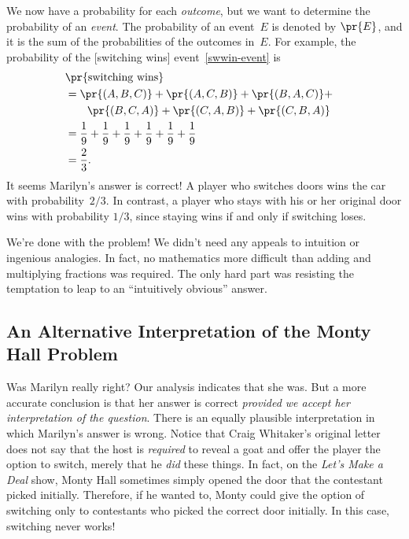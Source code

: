 We now have a probability for each \emph{outcome}, but we want to
determine the probability of an \emph{event}.  The probability of an
event~$E$ is denoted by $\pr{E}$, and it is the sum of the
probabilities of the outcomes in~$E$.  For example, the probability of
the [switching wins] event~\eqref{swwin-event} is
\begin{align*}
\lefteqn{\pr{\text{switching wins}}}\\
    & = \pr{(A, B, C)} + \pr{(A, C, B)} + \pr{(B, A, C)} + \\
    & \qquad \pr{(B, C, A)} + \pr{(C, A, B)} + \pr{(C, B, A)} \\
    & = \frac{1}{9} + \frac{1}{9} + \frac{1}{9} +
        \frac{1}{9} + \frac{1}{9} + \frac{1}{9} \\
    & = \frac{2}{3}.
\end{align*}
It seems Marilyn's answer is correct!  A player who switches doors
wins the car with probability~$2/3$.  In contrast, a player who stays
with his or her original door wins with probability $1/3$, since
staying wins if and only if switching loses.

We're done with the problem!  We didn't need any appeals to intuition
or ingenious analogies.  In fact, no mathematics more difficult than
adding and multiplying fractions was required.  The only hard part was
resisting the temptation to leap to an ``intuitively obvious'' answer.

\subsection{An Alternative Interpretation of the Monty Hall Problem}

Was Marilyn really right?  Our analysis indicates that she was.  But a
more accurate conclusion is that her answer is correct \emph{provided
  we accept her interpretation of the question}.  There is an equally
plausible interpretation in which Marilyn's answer is wrong.  Notice
that Craig Whitaker's original letter does not say that the host is
\emph{required} to reveal a goat and offer the player the option to
switch, merely that he \emph{did} these things.  In fact, on the
\emph{Let's Make a Deal} show, Monty Hall sometimes simply opened the
door that the contestant picked initially.  Therefore, if he wanted
to, Monty could give the option of switching only to contestants who
picked the correct door initially.  In this case, switching never
works!

\begin{problems}
\practiceproblems

\examproblems
{}

\classproblems
{}

\homeworkproblems
{}

\end{problems}

